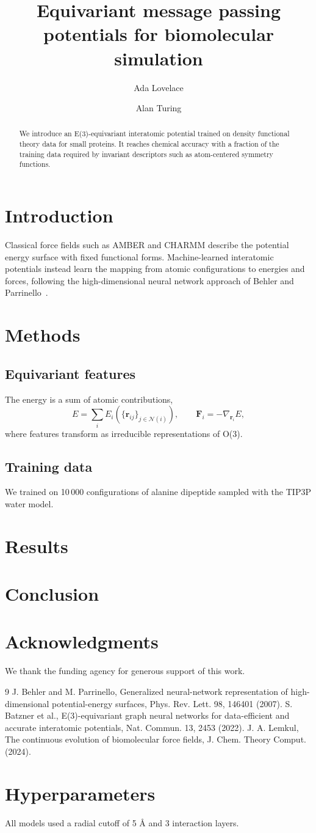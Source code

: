 \documentclass[10pt,twocolumn]{article}
\title{Equivariant message passing potentials for biomolecular simulation}
\author{Ada Lovelace \and Alan Turing}
\begin{document}
\maketitle
\begin{abstract}
We introduce an E(3)-equivariant interatomic potential trained on density functional theory data for small proteins. It reaches chemical accuracy with a fraction of the training data required by invariant descriptors such as atom-centered symmetry functions.
\end{abstract}
\section{Introduction}
Classical force fields such as AMBER and CHARMM describe the potential energy surface with fixed functional forms. Machine-learned interatomic potentials instead learn the mapping from atomic configurations to energies and forces, following the high-dimensional neural network approach of Behler and Parrinello~\cite{bp}. \lipsum[1-2]
\section{Methods}
\subsection{Equivariant features}
The energy is a sum of atomic contributions,
\begin{equation}
E = \sum_i E_i(\{\mathbf{r}_{ij}\}_{j \in \mathcal{N}(i)}), \qquad \mathbf{F}_i = -\nabla_{\mathbf{r}_i} E,
\end{equation}
where features transform as irreducible representations of O(3). \lipsum[3-4]
\subsection{Training data}
We trained on 10\,000 configurations of alanine dipeptide sampled with the TIP3P water model. \lipsum[5-6]
\section{Results}
\lipsum[7-9]
\section{Conclusion}
\lipsum[10]
\section*{Acknowledgments}
We thank the funding agency for generous support of this work.
\begin{thebibliography}{9}
 J. Behler and M. Parrinello, Generalized neural-network representation of high-dimensional potential-energy surfaces, Phys. Rev. Lett. 98, 146401 (2007).
 S. Batzner et al., E(3)-equivariant graph neural networks for data-efficient and accurate interatomic potentials, Nat. Commun. 13, 2453 (2022).
 J. A. Lemkul, The continuous evolution of biomolecular force fields, J. Chem. Theory Comput. (2024).
\end{thebibliography}
\appendix
\section{Hyperparameters}
All models used a radial cutoff of 5 \AA{} and 3 interaction layers. \lipsum[11]
\end{document}
